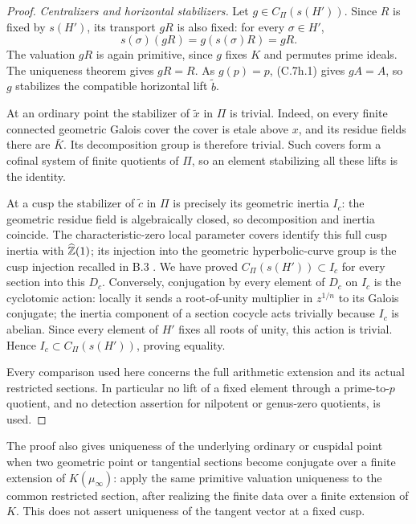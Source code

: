 \begin{proof}
\emph{Centralizers and horizontal stabilizers.}
Let $g\in C_\Pi(s(H'))$. Since $R$ is fixed by $s(H')$, its transport
$gR$ is also fixed: for every $\sigma\in H'$,
\[
 s(\sigma)(gR)=g(s(\sigma)R)=gR.
\]
The valuation $gR$ is again primitive, since $g$ fixes $K$ and permutes
prime ideals. The uniqueness theorem gives $gR=R$. As $g(p)=p$,
(C.7h.1) gives $gA=A$, so $g$ stabilizes the compatible horizontal
lift $\widetilde b$.

At an ordinary point the stabilizer of $\widetilde x$ in $\Pi$ is
trivial. Indeed, on every finite connected geometric Galois cover the
cover is etale above $x$, and its residue fields there are $\bar K$.
Its decomposition group is therefore trivial. Such covers form a
cofinal system of finite quotients of $\Pi$, so an element stabilizing
all these lifts is the identity.

At a cusp the stabilizer of $\widetilde c$ in $\Pi$ is precisely its
geometric inertia $I_c$: the geometric residue field is algebraically
closed, so decomposition and inertia coincide. The characteristic-zero
local parameter covers identify this full cusp inertia with
$\widehat{\mathbb Z}(1)$; its injection into the geometric hyperbolic-curve
group is the cusp injection recalled in B.3
\citep[Proposition 1.2]{BC_MochComb}. We have proved
$C_\Pi(s(H'))\subset I_c$ for every section into this $D_c$.
Conversely, conjugation by every element of $D_c$ on $I_c$ is the
cyclotomic action: locally it sends a root-of-unity multiplier in
$z^{1/n}$ to its Galois conjugate; the inertia component of a section
cocycle acts trivially because $I_c$ is abelian.
Since every element of $H'$ fixes
all roots of unity, this action is trivial. Hence
$I_c\subset C_\Pi(s(H'))$, proving equality.

Every comparison used here concerns the full arithmetic extension and
its actual restricted sections. In particular no lift of a fixed
element through a prime-to-$p$ quotient, and no detection assertion for
nilpotent or genus-zero quotients, is used.
\end{proof}

The proof also gives uniqueness of the underlying ordinary or cuspidal
point when two geometric point or tangential sections become conjugate
over a finite extension of $K(\mu_\infty)$: apply the same primitive
valuation uniqueness to the common restricted section, after realizing
the finite data over a finite extension of $K$. This does not assert
uniqueness of the tangent vector at a fixed cusp.
